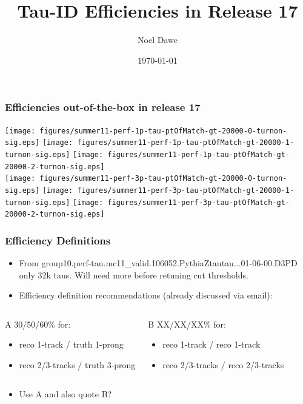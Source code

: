 \documentclass[9pt,hyperref={pdfpagelabels=false},professionalfonts,table,xcolor=dvipsnames]{beamer}
\title{Tau-ID Efficiencies in Release 17}
\author{Noel Dawe}
\institute{Simon Fraser University}
\date{\today}
\begin{document}
\begin{frame}
\titlepage
\end{frame}

\begin{frame}
\frametitle{Efficiencies out-of-the-box in release 17}
\begin{center}
\texttt{[image: figures/summer11-perf-1p-tau-ptOfMatch-gt-20000-0-turnon-sig.eps]}
\texttt{[image: figures/summer11-perf-1p-tau-ptOfMatch-gt-20000-1-turnon-sig.eps]}
\texttt{[image: figures/summer11-perf-1p-tau-ptOfMatch-gt-20000-2-turnon-sig.eps]}\\
\texttt{[image: figures/summer11-perf-3p-tau-ptOfMatch-gt-20000-0-turnon-sig.eps]}
\texttt{[image: figures/summer11-perf-3p-tau-ptOfMatch-gt-20000-1-turnon-sig.eps]}
\texttt{[image: figures/summer11-perf-3p-tau-ptOfMatch-gt-20000-2-turnon-sig.eps]}
\end{center}
\end{frame}

\begin{frame}
\frametitle{Efficiency Definitions}
\begin{itemize}
\item From group10.perf-tau.mc11\_valid.106052.PythiaZtautau...01-06-00.D3PD only 32k taus.
Will need more before retuning cut thresholds.
\item Efficiency definition recommendations (already discussed via email):
\end{itemize}
\begin{columns}[c]
\begin{block}{A}
30/50/60\% for:
\begin{itemize}
\item reco 1-track / truth 1-prong
\item reco 2/3-tracks / truth 3-prong
\end{itemize}
\end{block}
\begin{block}{B}
XX/XX/XX\% for:
\begin{itemize}
\item reco 1-track / reco 1-track
\item reco 2/3-tracks / reco 2/3-tracks
\end{itemize}
\end{block}
\end{columns}
\vspace{.5cm}
\begin{itemize}
\item Use A and also quote B?
\end{itemize}
\end{frame}
\end{document}
